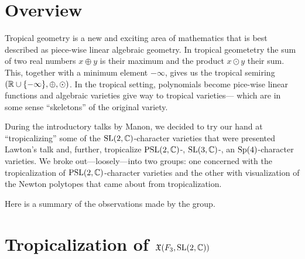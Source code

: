 \documentclass[11pt]{article}
\begin{document}
\renewcommand*{\thefootnote}{\fnsymbol{footnote}}

\thispagestyle{empty}%

\author[1]{Shams Alyusof}
\author[4]{Corry Bedwell}
\author[2]{Ellie Dannenberg}
\author[5]{Dmitry Gekhtman}
\author[1]{Charlie Katerba}
\author[1]{Jack Love}
\author[1]{Chris Manon}
\author[3]{Giuseppe Martone}
\author[6]{\href{mailto:\email}{\auth}}%

\renewcommand\Authands{ and }
\title{\tight}%
\date{\today}%

\maketitle
\section{Overview}
Tropical geometry is a new and exciting area of mathematics that is best
described as piece-wise linear algebraic geometry. In tropical geometetry
the sum of two real numbers $x\oplus y$ is their maximum and the product
$x\odot y$ their sum. This, together with a minimum element $-\infty$,
gives us the tropical semiring $(\mathbb{R}\cup\{-\infty\},\oplus,\odot)$. In the
tropical setting, polynomials become pice-wise linear functions and
algebraic varieties give way to tropical varieties--- which are in some
sense ``skeletons'' of the original variety.

During the introductory talks by Manon, we decided to try our hand at
``tropicalizing'' some of the $\mathrm{SL}(2,\mathbb{C})$-character varieties that were
presented Lawton's talk and, further, tropicalize $\mathrm{PSL}(2,\mathbb{C})$-,
$\mathrm{SL}(3,\mathbb{C})$-, an $\mathrm{Sp}(4)$-character varieties. We broke
out---loosely---into two groups: one concerned with the tropicalization of
$\mathrm{PSL}(2,\mathbb{C})$-character varieties and the other with visualization of the
Newton polytopes that came about from tropicalization.

Here is a summary of the observations made by the group.

\section{Tropicalization of $\mathfrak{X}(F_3,\mathrm{SL}(2,\mathbb{C}))$}
\end{document}
